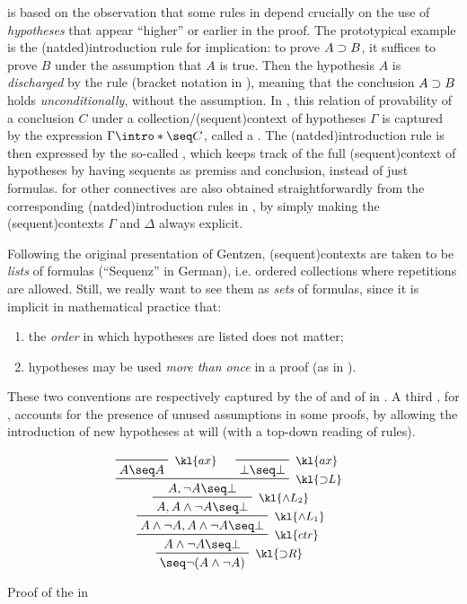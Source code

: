  is based on the observation that some rules in  depend crucially on the use of \emph{hypotheses} that appear
``higher'' or earlier in the proof. The prototypical example is the
\kl(natded){introduction rule}  for implication: to prove $A \supset
B$, it suffices to prove $B$ under the assumption that $A$ is true. Then the
hypothesis $A$ is \emph{discharged} by the rule (bracket notation in
), meaning that the conclusion $A \supset B$ holds
\emph{unconditionally}, without the assumption. In , this
relation of provability of a conclusion $C$ under a
collection/\intro(sequent){context} of hypotheses $\Gamma$ is captured by the
expression $\Gamma \intro*\seq C$, called a . The
\kl(natded){introduction rule}  is then expressed by the so-called
 , which keeps track of the full
\kl(sequent){context} of hypotheses by having sequents as premiss and
conclusion, instead of just formulas.  for other
connectives are also obtained straightforwardly from the corresponding
\kl(natded){introduction rules} in , by simply making the
\kl(sequent){contexts} $\Gamma$ and $\Delta$ always explicit.

Following the original presentation of Gentzen, \kl(sequent){contexts} are taken
to be \emph{lists} of formulas (``Sequenz'' in German), i.e. ordered collections
where repetitions are allowed. Still, we really want to see them as \emph{sets}
of formulas, since it is implicit in mathematical practice that:
\begin{enumerate}
\item the \emph{order} in which hypotheses are listed does not matter;
\item hypotheses may be used \emph{more than once} in a proof (as in
).
\end{enumerate}
These two conventions are respectively captured by the 
 of  and  of  in
. A third ,  for
, accounts for the presence of unused assumptions in some
proofs, by allowing the introduction of new hypotheses at will (with a top-down
reading of rules).

\begin{marginfigure}
  $$
  \R[\kl{{\limp}R}]
  {\R[\kl{ctr}]
  {\R[\kl{\land L_1}]
  {\R[\kl{\land L_2}]
  {\R[\kl{{\limp}L}]
    {\R[\kl{ax}]
    {A \seq A}}
    {\R[\kl{ax}]
    {\bot \seq \bot}}
    {A, \neg A \seq \bot}}
  {A, A \land \neg A \seq \bot}}
  {A \land \neg A, A \land \neg A \seq \bot}}
  {A \land \neg A \seq \bot}}
  {\seq \neg (A \land \neg A)}
  $$
  \caption{Proof of the  in }
\end{marginfigure}


